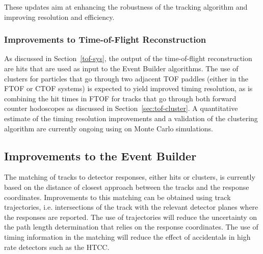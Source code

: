 These updates aim at enhancing the robustness of the tracking algorithm and improving resolution and efficiency.

\subsubsection{Improvements to Time-of-Flight Reconstruction}

As discussed in Section~\ref{tof-sys}, the output of the time-of-flight reconstruction are hits that are used
as input to the Event Builder algorithms. The use of clusters for particles that go through two adjacent TOF
paddles (either in the FTOF or CTOF systems) is expected to yield improved timing resolution, as is combining
the hit times in FTOF for tracks that go through both forward counter hodoscopes as discussed in
Section~\ref{sec:tof-cluster}. A quantitative estimate of the timing resolution improvements and a validation of
the clustering algorithm are currently ongoing using on Monte Carlo simulations.

\subsection{Improvements to the Event Builder}

The matching of tracks to detector responses, either hits or clusters, is currently based on the distance of closest
approach between the tracks and the response coordinates. Improvements to this matching can be obtained using
track trajectories, i.e. intersections of the track with the relevant detector planes where the responses are reported.
The use of trajectories will reduce the uncertainty on the path length determination that relies on the response
coordinates. The use of timing information in the matching will reduce the effect of accidentals in high rate detectors
such as the HTCC.


